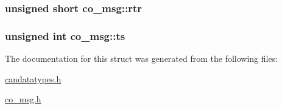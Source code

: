 \subsubsection[{\texorpdfstring{rtr}{rtr}}]{\setlength{\rightskip}{0pt plus 5cm}unsigned short co\+\_\+msg\+::rtr}\hypertarget{structco__msg_a4352880745fa6bc63d6c4e3c77870029}{}\label{structco__msg_a4352880745fa6bc63d6c4e3c77870029}
\subsubsection[{\texorpdfstring{ts}{ts}}]{\setlength{\rightskip}{0pt plus 5cm}unsigned int co\+\_\+msg\+::ts}\hypertarget{structco__msg_aaf8cd43d17baf495c982c87866fc90b2}{}\label{structco__msg_aaf8cd43d17baf495c982c87866fc90b2}


The documentation for this struct was generated from the following files\+:\begin{DoxyCompactItemize}
\item 
\hyperlink{candatatypes_8h}{candatatypes.\+h}\item 
\hyperlink{co__msg_8h}{co\+\_\+msg.\+h}\end{DoxyCompactItemize}

